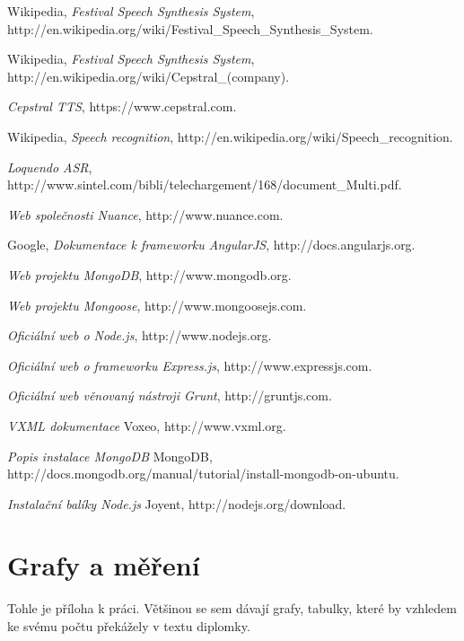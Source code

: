 \documentclass[ing,male,java,dept460]{diploma}						%
\begin{document}
\begin{thebibliography}{99}
 Wikipedia,
\textit{Festival Speech Synthesis System}, http://en.wikipedia.org/wiki/Festival\_Speech\_Synthesis\_System.

 Wikipedia,
\textit{Festival Speech Synthesis System}, http://en.wikipedia.org/wiki/Cepstral\_(company).

\textit{Cepstral TTS}, https://www.cepstral.com.

 Wikipedia,
\textit{Speech recognition}, http://en.wikipedia.org/wiki/Speech\_recognition.

\textit{Loquendo ASR}, http://www.sintel.com/bibli/telechargement/168/document\_Multi.pdf.

\textit{Web společnosti Nuance}, http://www.nuance.com.

 Google,
\textit{Dokumentace k frameworku AngularJS}, http://docs.angularjs.org.

\textit{Web projektu MongoDB}, http://www.mongodb.org.

\textit{Web projektu Mongoose}, http://www.mongoosejs.com.

\textit{Oficiální web o Node.js}, http://www.nodejs.org.

\textit{Oficiální web o frameworku Express.js}, http://www.expressjs.com.

\textit{Oficiální web věnovaný nástroji Grunt}, http://gruntjs.com.

\textit{VXML dokumentace} Voxeo, http://www.vxml.org.

\textit{Popis instalace MongoDB} MongoDB, http://docs.mongodb.org/manual/tutorial/install-mongodb-on-ubuntu.

\textit{Instalační balíky Node.js} Joyent, http://nodejs.org/download.

\end{thebibliography}

\appendix
\section{Grafy a měření}
Tohle je příloha k práci. Většinou se sem dávají grafy, tabulky, které by vzhledem
ke svému počtu překážely v textu diplomky.
\clearpage
\end{document}
